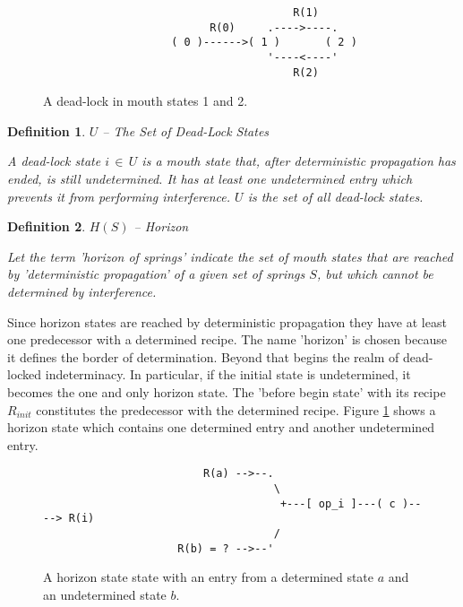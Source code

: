 \documentclass[12pt,a4paper]{scrartcl}
\newtheorem{definition}{Definition}
\begin{document}
\begin{figure}[htbp] \leavevmode
\begin{verbatim}
                                       R(1)
                          R(0)     .---->----.
                    ( 0 )------>( 1 )       ( 2 )
                                   '----<----'
                                       R(2)

\end{verbatim}
\caption{A dead-lock in mouth states 1 and 2.}
\end{figure}

\begin{definition} $U$ -- The Set of Dead-Lock States

A dead-lock state $i\,\in\,U$ is a mouth state that, after deterministic
propagation has ended, is still undetermined. It has at least one undetermined
entry which prevents it from performing interference. $U$ is the set of all
dead-lock states.

\end{definition}


\begin{definition} $H(S)$ -- Horizon

    Let the term 'horizon of springs' indicate the set of mouth states that are
    reached by 'deterministic propagation' of a given set of springs $S$, but
    which cannot be determined by interference.

\end{definition}

Since horizon states are reached by deterministic propagation they have at least
one predecessor with a determined recipe.  The name 'horizon' is chosen because
it defines the border of determination.  Beyond that begins the realm of
dead-locked indeterminacy.  In particular, if the initial state is undetermined, it becomes
the one and only horizon state. The 'before begin state' with its recipe
$R_{init}$ constitutes the predecessor with the determined recipe.  Figure
\ref{fig:horizon-state} shows a horizon state which contains one determined
entry and another undetermined entry. 

\begin{figure}[htbp] \leavevmode \label{fig:horizon-state}
\begin{verbatim}
                         R(a) -->--.
                                    \
                                     +---[ op_i ]---( c )----> R(i)
                                    /
                     R(b) = ? -->--'

\end{verbatim}
\caption{A horizon state state with an entry from a determined state $a$ and 
    an undetermined state $b$.}
\end{figure}
\end{document}
